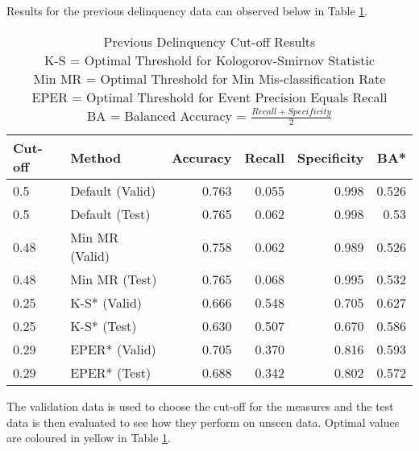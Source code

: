 Results for the previous delinquency data can observed below in Table \ref{table:DelinquencyModelCutoff}. 	

\begin{table}[H]
	\centering
\small
		\begin{tabular}{|l|l|r|r|r|r|}
			\hline
			\textbf{Cut-off} & \textbf{Method}       & \textbf{Accuracy} & \textbf{Recall} & \textbf{Specificity}  & \textbf{BA*} \\ \hline
			0.5              & Default (Valid)       & 0.763             & 0.055           & 0.998                  & 0.526    \\
			0.5              & Default (Test)        & 0.765             & 0.062           & 0.998                    & 0.53  \\ \hline
			0.48             & Min MR (Valid)        & 0.758             & 0.062           & 0.989                       & 0.526 \\
			0.48             & Min MR (Test)         & \cellcolor{yellow!25}0.765         & 0.068                & \cellcolor{yellow!25}0.995    & 0.532   \\ \hline
			0.25             & K-S* (Valid) 		     & 0.666             & 0.548           & 0.705                    & 0.627  \\
			0.25             & K-S* (Test)  		     & 0.630             & \cellcolor{yellow!25}0.507                          & 0.670  & \cellcolor{yellow!25}0.586     \\ \hline
			0.29             & EPER* (Valid)          & 0.705             & 0.370           & 0.816                    & 0.593   \\
			0.29             & EPER* (Test)           & 0.688             & 0.342           & 0.802                 & 0.572    \\ \hline
		\end{tabular}
	\caption{Previous Delinquency Cut-off Results 
			\\ K-S = Optimal Threshold for Kologorov-Smirnov Statistic
			\\ Min MR = Optimal Threshold for Min Mis-classification Rate
			\\ EPER = Optimal Threshold for Event Precision Equals Recall
			\\ BA = Balanced Accuracy = $\frac{Recall + Specificity }{2}$
		}
	\label{table:DelinquencyModelCutoff}
\end{table}

The validation data is used to choose the cut-off for the measures and the test data is then evaluated to see how they perform on unseen data. Optimal values are coloured in yellow in Table \ref{table:DelinquencyModelCutoff}.

